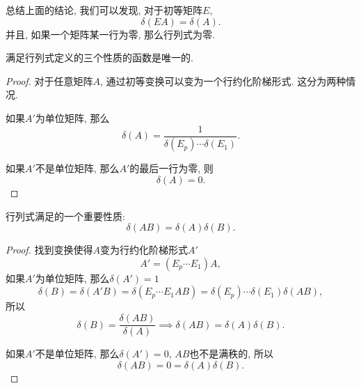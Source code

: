总结上面的结论, 我们可以发现, 对于初等矩阵$E$, 
\begin{equation}
  \delta (EA) = \delta (A).
\end{equation}
并且, 如果一个矩阵某一行为零, 那么行列式为零.

\begin{proposition}
    满足行列式定义的三个性质的函数是唯一的.
\end{proposition}

\begin{proof}
    对于任意矩阵$A$, 通过初等变换可以变为一个行约化阶梯形式.
    这分为两种情况.

    如果$A'$为单位矩阵, 那么
    \begin{equation}
      \delta (A)  = \frac{1}{\delta(E_p) \cdots \delta(E_1)}.
    \end{equation}

    如果$A'$不是单位矩阵, 那么$A'$的最后一行为零, 则
    \begin{equation}
      \delta (A) = 0.
    \end{equation}
\end{proof}

行列式满足的一个重要性质: 
\begin{equation}
  \delta (AB) = \delta (A) \delta (B).
\end{equation}


\begin{proof}
  找到变换使得$A$变为行约化阶梯形式$A'$
  \begin{equation}
    A' = \left( E_p \cdots E_1 \right) A,
  \end{equation}
  如果$A'$为单位矩阵, 那么$\delta (A') = 1$
  \begin{equation}
    \delta (B) = \delta (A'B) = \delta (E_p \cdots E_1 A B) = \delta (E_p) \cdots \delta (E_1) \delta (AB),
  \end{equation}
  所以
  \begin{equation}
    \delta (B) = \frac{\delta(AB)}{\delta (A)} \implies \delta (AB) = \delta (A) \delta (B).
  \end{equation}

  如果$A'$不是单位矩阵, 那么$\delta (A') = 0$, $AB$也不是满秩的, 所以
  \begin{equation}
    \delta (AB) = 0 = \delta (A) \delta (B).
  \end{equation}
\end{proof}

